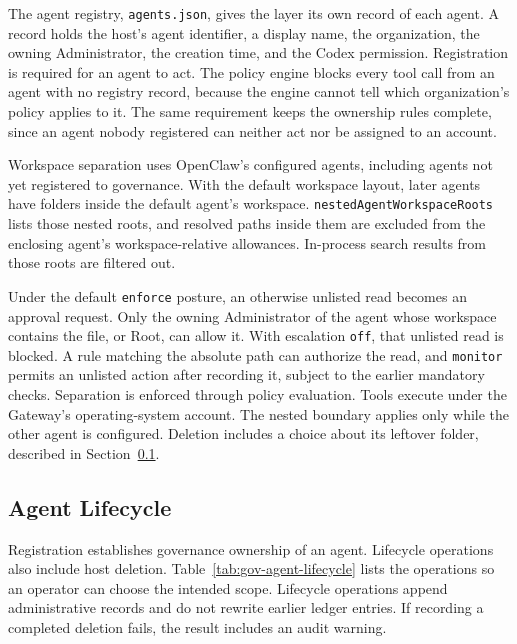The agent registry, \texttt{agents.json}, gives the layer its own record
of each agent. A record holds the host's agent identifier, a display name,
the organization, the owning Administrator, the creation time, and the
Codex permission. Registration is required for an agent to act. The policy
engine blocks every tool call from an agent with no registry record,
because the engine cannot tell which organization's policy applies to it.
The same requirement keeps the ownership rules complete, since an agent
nobody registered can neither act nor be assigned to an account.

{\color{red}Workspace separation uses OpenClaw's configured agents, including
agents not yet registered to governance. With the default workspace layout,
later agents have folders inside the default agent's workspace.
\texttt{nestedAgentWorkspaceRoots} lists those nested roots, and resolved
paths inside them are excluded from the enclosing agent's workspace-relative
allowances. In-process search results from those roots are filtered out.

Under the default \texttt{enforce} posture, an otherwise unlisted read becomes
an approval request. Only the owning Administrator of the agent whose
workspace contains the file, or Root, can allow it. With escalation
\texttt{off}, that unlisted read is blocked. A rule matching the absolute
path can authorize the read, and \texttt{monitor} permits an unlisted action
after recording it, subject to the earlier mandatory checks. Separation is
enforced through policy evaluation. Tools execute under the Gateway's
operating-system account. The nested boundary applies only while the other
agent is configured. Deletion includes a
choice about its leftover folder, described in
Section~\ref{sec:gov-lifecycle}.}

\subsection{Agent Lifecycle}
\label{sec:gov-lifecycle}

{\color{red}Registration establishes governance ownership of an agent.
Lifecycle operations also include host deletion. Table~\ref{tab:gov-agent-lifecycle} lists the operations
so an operator can choose the intended scope. Lifecycle operations append
administrative records and do not rewrite earlier ledger entries. If recording
a completed deletion fails, the result includes an audit warning.}

